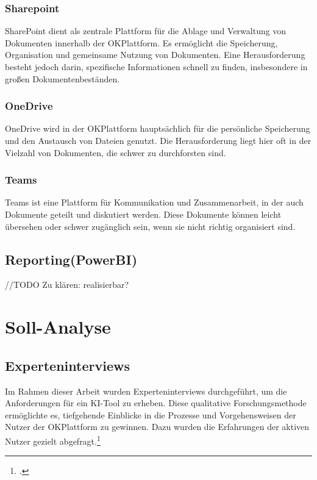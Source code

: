 \subsubsection{Sharepoint}

SharePoint dient als zentrale Plattform für die Ablage und Verwaltung von Dokumenten innerhalb der OKPlattform. Es ermöglicht die Speicherung, Organisation und gemeinsame Nutzung von Dokumenten. Eine Herausforderung besteht jedoch darin, spezifische Informationen schnell zu finden, insbesondere in großen Dokumentenbeständen.

\subsubsection{OneDrive}

OneDrive wird in der OKPlattform hauptsächlich für die persönliche Speicherung und den Austausch von Dateien genutzt. Die Herausforderung liegt hier oft in der Vielzahl von Dokumenten, die schwer zu durchforsten sind. 

\subsubsection{Teams}

Teams ist eine Plattform für Kommunikation und Zusammenarbeit, in der auch Dokumente geteilt und diskutiert werden. Diese Dokumente können leicht übersehen oder schwer zugänglich sein, wenn sie nicht richtig organisiert sind.

\subsection{Reporting(PowerBI)}

//TODO
Zu klären: realisierbar?

\section{Soll-Analyse}

\subsection{Experteninterviews}

Im Rahmen dieser Arbeit wurden Experteninterviews durchgeführt, um die Anforderungen für ein KI-Tool zu erheben. Diese qualitative Forschungsmethode ermöglichte es, tiefgehende Einblicke in die Prozesse und Vorgehensweisen der Nutzer der OKPlattform zu gewinnen. Dazu wurden die Erfahrungen der aktiven Nutzer gezielt abgefragt.\footcite[4]{wernitz_experteninterview_2018}

